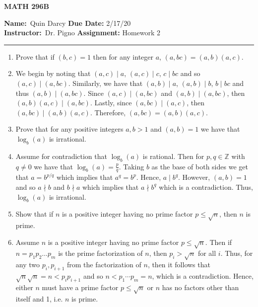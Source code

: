 \documentclass[12pt]{article}
\makeatletter
\theoremstyle{definition}
\theoremstyle{remark}
\renewenvironment{proof}[1][\proofname]{\par
  \pushQED{\qed}%
  \normalfont \topsep6\p@\@plus6\p@\relax
  \list{}{\leftmargin=0mm
          \rightmargin=4mm
          \settowidth{\itemindent}{\itshape#1}%
          \labelwidth=\itemindent
          \parsep=0pt \listparindent=\parindent 
  }
  \item[\hskip\labelsep
        \itshape
    #1\@addpunct{.}]\ignorespaces
}{%
  \popQED\endlist\@endpefalse
}
\let\oldproofname=\proofname
\renewcommand{\proofname}{\bf{\textit{\oldproofname}}}
\makeatother
\begin{document}
\thispagestyle{empty}\hline

\begin{center}
	\vspace{.4cm} {\textbf { \large MATH 296B}}
\end{center}
{\textbf{Name:}\ Quin Darcy \hspace{\fill} \textbf{Due Date:} 2/17/20   \\
{ \textbf{Instructor:}}\ Dr. Pigno \hspace{\fill} \textbf{Assignment:} Homework 2 \\ \hrule}

\justifying

    \begin{enumerate}[leftmargin=*]
        \item Prove that if $(b,c)=1$ then for any integer $a$, $(a,bc)=(a,b)(a,c)$.
            \begin{proof}
                We begin by noting that $(a,c)\mid a$, $(a,c)\mid c$, $c\mid bc$ and so $(a,c)\mid(a,bc)$. Similarly, we have that $(a,b)\mid a$, $(a,b)\mid b$, $b\mid bc$ and thus $(a,b)\mid (a,bc)$. Since $(a,c)\mid (a,bc)$ and $(a,b)\mid(a,bc)$, then $(a,b)(a,c)\mid(a,bc)$. Lastly, since $(a,bc)\mid(a,c)$, then $(a,bc)\mid(a,b)(a,c)$. Therefore, $(a,bc)=(a,b)(a,c)$.
            \end{proof}
        \item Prove that for any positive integers $a,b>1$ and $(a,b)=1$ we have that $\log_b(a)$ is irrational.
            \begin{proof}
                Assume for contradiction that $\log_b(a)$ is rational. Then for $p,q\in\mathbb{Z}$ with $q\neq 0$ we have that $\log_b(a)=\frac{p}{q}$. Taking $b$ as the base of both sides we get that $a=b^{p/q}$ which implies that $a^q=b^p$. Hence, $a\mid b^q$. However, $(a,b)=1$ and so $a\nmid b$ and $b\nmid a$ which implies that $a\nmid b^q$ which is a contradiction. Thus, $\log_b(a)$ is irrational.
            \end{proof}
        \item Show that if $n$ is a positive integer having no prime factor $p\leq\sqrt{n}$, then $n$ is prime. 
            \begin{proof}
                Assume $n$ is a positive integer having no prime factor $p\leq \sqrt{n}$. Then if $n=p_1p_2\dots p_m$ is the prime factorization of $n$, then $p_i>\sqrt{n}$ for all $i$. Thus, for any two $p_i,p_{i+1}$ from the factorization of $n$, then it follows that $\sqrt{n}\sqrt{n}=n<p_ip_{i+1}$ and so $n<p_1\cdots p_m=n$, which is a contradiction. Hence, either $n$ must have a prime factor $p\leq\sqrt{n}$ or $n$ has no factors other than itself and 1, i.e. $n$ is prime.

\end{proof}
\end{enumerate}
\end{document}
